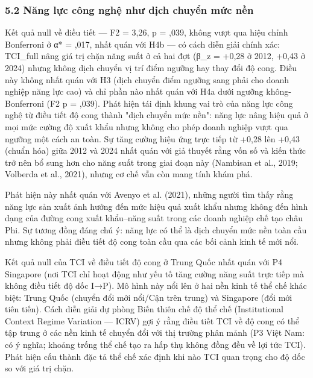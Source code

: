 \documentclass[12pt,a4paper]{article}
\begin{document}
\hypertarget{52-nux103ng-lux1ef1c-cuxf4ng-nghux1ec7-nhux1b0-dux1ecbch-chuyux1ec3n-mux1ee9c-nux1ec1n}{%
\subsubsection{5.2 Năng lực công nghệ như dịch chuyển mức
nền}\label{52-nux103ng-lux1ef1c-cuxf4ng-nghux1ec7-nhux1b0-dux1ecbch-chuyux1ec3n-mux1ee9c-nux1ec1n}}

Kết quả null về điều tiết --- F2 = 3,26, p = ,039, không vượt qua hiệu
chỉnh Bonferroni ở α* = ,017, nhất quán với H4b --- có cách diễn giải
chính xác: TCI\_full nâng giá trị chặn năng suất ở cả hai đợt (β\_z =
+0,28 ở 2012, +0,43 ở 2024) nhưng không dịch chuyển vị trí điểm ngưỡng
hay thay đổi độ cong. Điều này không nhất quán với H3 (dịch chuyển điểm
ngưỡng sang phải cho doanh nghiệp năng lực cao) và chỉ phần nào nhất
quán với H4a dưới ngưỡng không-Bonferroni (F2 p = ,039). Phát hiện tái
định khung vai trò của năng lực công nghệ từ điều tiết độ cong thành
"dịch chuyển mức nền": năng lực nâng hiệu quả ở mọi mức cường độ xuất
khẩu nhưng không cho phép doanh nghiệp vượt qua ngưỡng một cách an toàn.
Sự tăng cường hiệu ứng trực tiếp từ +0,28 lên +0,43 (chuẩn hóa) giữa
2012 và 2024 nhất quán với giả thuyết rằng vốn số và kiến thức trở nên
bổ sung hơn cho năng suất trong giai đoạn này (Nambisan et al., 2019;
Volberda et al., 2021), nhưng cơ chế vẫn còn mang tính khám phá.

Phát hiện này nhất quán với Avenyo et al. (2021), những người tìm thấy
rằng năng lực sản xuất ảnh hưởng đến mức hiệu quả xuất khẩu nhưng không
đến hình dạng của đường cong xuất khẩu--năng suất trong các doanh nghiệp
chế tạo châu Phi. Sự tương đồng đáng chú ý: năng lực có thể là dịch
chuyển mức nền toàn cầu nhưng không phải điều tiết độ cong toàn cầu qua
các bối cảnh kinh tế mới nổi.

Kết quả null của TCI về điều tiết độ cong ở Trung Quốc nhất quán với P4
Singapore (nơi TCI chỉ hoạt động như yếu tố tăng cường năng suất trực
tiếp mà không điều tiết độ dốc I→P). Mô hình này nổi lên ở hai nền kinh
tế thể chế khác biệt: Trung Quốc (chuyển đổi mới nổi/Cận trên trung) và
Singapore (đổi mới tiên tiến). Cách diễn giải dự phòng Biến thiên chế độ
thể chế (Institutional Context Regime Variation --- ICRV) gợi ý rằng
điều tiết TCI về độ cong có thể tập trung ở các nền kinh tế chuyển đổi
với thị trường phân mảnh (P3 Việt Nam: có ý nghĩa; khoảng trống thể chế
tạo ra hấp thụ không đồng đều về lợi tức TCI). Phát hiện cấu thành đặc
tả thể chế xác định khi nào TCI quan trọng cho độ dốc so với giá trị
chặn.
\end{document}

